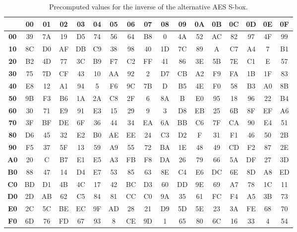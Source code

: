 \begin{table}[ht!]
\begin{center}
    \caption{Precomputed values for the inverse of the alternative AES S-box.}
    \label{tab:aesAltFullInverse}
    \begin{tabular}{|c|c|c|c|c|c|c|c|c|c|c|c|c|c|c|c|c|} \hline
    ~ & \textbf{00} & \textbf{01} & \textbf{02} & \textbf{03} & \textbf{04} & \textbf{05} & \textbf{06} & \textbf{07} & \textbf{08} & \textbf{09} & \textbf{0A} & \textbf{0B} & \textbf{0C} & \textbf{0D} & \textbf{0E} & \textbf{0F} \\ \hline
\textbf{00} & 39 & 7A & 19 & D5 & 74 & 56 & 64 & B8 & 0 & 4A & 52 & AC & 82 & 97 & 4F & 99 \\
\textbf{10} & 8C & D0 & AF & DB & C9 & 38 & 98 & 40 & 1D & 7C & 89 & A & C7 & A4 & 7 & B1 \\ 
\textbf{20} & B2 & 4D & 77 & 3C & B9 & F7 & C2 & FF & 41 & 86 & 3E & 5B & 7E & C1 & E & 57 \\
\textbf{30} & 75 & 7D & CF & 43 & 10 & AA & 92 & 2 & D7 & CB & A2 & F9 & FA & 1B & 1F & 83 \\ 
\textbf{40} & E8 & 12 & A1 & 94 & 5 & F6 & 9C & 7B & D & B5 & 4E & F0 & 58 & B3 & A0 & 8B \\
\textbf{50} & 9B & F3 & B6 & 1A & 2A & C8 & 2F & 6 & 8A & B & E0 & 95 & 18 & 96 & 22 & B4 \\
\textbf{60} & 30 & 71 & E9 & 91 & E3 & 15 & 29 & 9 & 3 & D8 & EB & 25 & 6B & 8F & EF & A6 \\
\textbf{70} & 3F & BF & DE & 6F & 36 & 44 & 34 & EA & 6A & BB & C6 & 7F & CA & 90 & E4 & 51 \\
\textbf{80} & D6 & 45 & 32 & E2 & B0 & AE & EE & 24 & C3 & D2 & F & 31 & F1 & 46 & 50 & 2B \\ 
\textbf{90} & F5 & 37 & 5F & 13 & 59 & A9 & 55 & 72 & BA & 1E & 48 & 49 & CD & F2 & 87 & 2E \\ 
\textbf{A0} & 20 & C & B7 & E1 & E5 & A3 & FB & F8 & DA & 26 & 79 & 66 & 5A & DF & 27 & 3D \\ 
\textbf{B0} & 88 & 47 & 14 & D4 & E7 & 53 & 85 & 63 & 8E & C4 & E6 & DC & 6E & 8D & A8 & ED \\
\textbf{C0} & BD & D1 & 4B & 4C & 17 & 42 & BC & D3 & 60 & DD & 9E & 69 & A7 & 78 & 1C & 11 \\
\textbf{D0} & 2D & AB & 62 & C5 & 84 & 81 & CC & C0 & 9A & 35 & 61 & FC & F4 & A5 & 3B & 73 \\ 
\textbf{E0} & 2C & 5C & BE & EC & 9F & AD & 28 & 21 & D9 & 5D & 5E & 23 & 3A & FE & 68 & 70 \\
\textbf{F0} & 6D & 76 & FD & 67 & 93 & 8 & CE & 9D & 1 & 65 & 80 & 6C & 16 & 33 & 4 & 54 \\ \hline
    \end{tabular}
\end{center}
\end{table}

